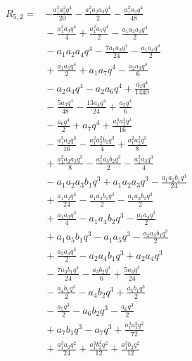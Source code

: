 \begin{align*}
R_{5,2}={}&- \frac{a_{1}^{3} a_{2}^{2} q^{4}}{20} - \frac{a_{1}^{2} a_{2} a_{3} q^{4}}{2} - \frac{a_{1}^{2} a_{2} q^{4}}{48}\\
&{}- \frac{a_{1}^{2} a_{3} q^{4}}{4} + \frac{a_{1}^{2} a_{5} q^{4}}{2} - \frac{a_{1} a_{2} a_{3} q^{4}}{2}\\
&{}- a_{1} a_{2} a_{4} q^{4} - \frac{7 a_{1} a_{3} q^{4}}{24} - \frac{a_{1} a_{4} q^{4}}{2}\\
&{}+ \frac{a_{1} a_{5} q^{4}}{2} + a_{1} a_{7} q^{4} - \frac{a_{2} a_{3} q^{4}}{6}\\
&{}- a_{2} a_{4} q^{4} - a_{2} a_{6} q^{4} + \frac{a_{2} q^{4}}{1440}\\
&{}- \frac{5 a_{3} q^{4}}{48} - \frac{13 a_{4} q^{4}}{24} + \frac{a_{5} q^{4}}{6}\\
&{}- \frac{a_{6} q^{4}}{2} + a_{7} q^{4} + \frac{a_{1}^{3} a_{2}^{2} q^{3}}{16}\\
&{}- \frac{a_{1}^{3} a_{2} q^{3}}{16} - \frac{a_{1}^{2} a_{2}^{2} b_{1} q^{3}}{4} + \frac{a_{1}^{2} a_{2}^{2} q^{3}}{8}\\
&{}+ \frac{a_{1}^{2} a_{2} a_{3} q^{3}}{8} - \frac{a_{1}^{2} a_{3} b_{2} q^{3}}{2} - \frac{a_{1}^{2} a_{3} q^{3}}{4}\\
&{}- a_{1} a_{2} a_{3} b_{1} q^{3} + a_{1} a_{2} a_{3} q^{3} - \frac{a_{1} a_{2} b_{1} q^{3}}{24}\\
&{}+ \frac{a_{1} a_{2} q^{3}}{24} - \frac{a_{1} a_{3} b_{1} q^{3}}{2} - \frac{a_{1} a_{3} b_{2} q^{3}}{2}\\
&{}+ \frac{a_{1} a_{3} q^{3}}{4} - a_{1} a_{4} b_{2} q^{3} - \frac{a_{1} a_{4} q^{3}}{2}\\
&{}+ a_{1} a_{5} b_{1} q^{3} - a_{1} a_{5} q^{3} - \frac{a_{2} a_{3} b_{1} q^{3}}{2}\\
&{}+ \frac{a_{2} a_{3} q^{3}}{2} - a_{2} a_{4} b_{1} q^{3} + a_{2} a_{4} q^{3}\\
&{}- \frac{7 a_{3} b_{1} q^{3}}{24} - \frac{a_{3} b_{2} q^{3}}{6} + \frac{5 a_{3} q^{3}}{24}\\
&{}- \frac{a_{4} b_{1} q^{3}}{2} - a_{4} b_{2} q^{3} + \frac{a_{5} b_{1} q^{3}}{2}\\
&{}- \frac{a_{5} q^{3}}{2} - a_{6} b_{2} q^{3} - \frac{a_{6} q^{3}}{2}\\
&{}+ a_{7} b_{1} q^{3} - a_{7} q^{3} + \frac{a_{1}^{3} a_{2}^{2} q^{2}}{72}\\
&{}+ \frac{a_{1}^{3} a_{2} q^{2}}{24} + \frac{a_{1}^{3} b_{2}^{2} q^{2}}{12} + \frac{a_{1}^{3} b_{2} q^{2}}{12}\\

\end{align*}

